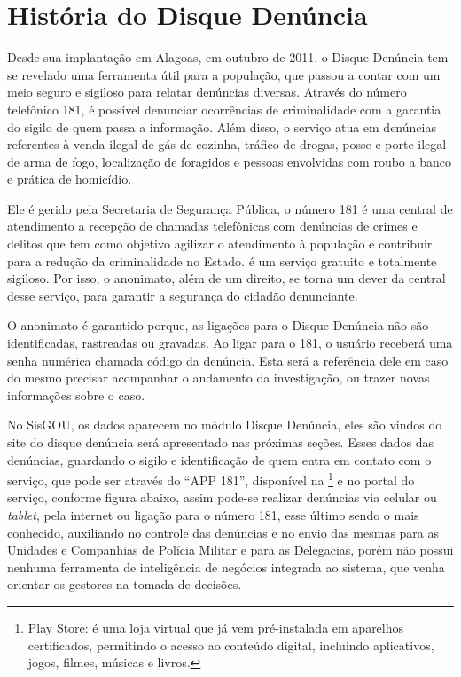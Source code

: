 \section{História do Disque Denúncia}		

Desde sua implanta\c{c}\~{a}o em Alagoas, em outubro de 2011, o Disque-Denúncia tem se revelado uma ferramenta útil para a popula\c{c}\~{a}o, que passou a contar com um meio seguro e sigiloso para relatar denúncias diversas.
Atrav\'{e}s do número telefônico 181, \'{e} possível denunciar ocorrências de criminalidade com a garantia do sigilo de quem passa a informa\c{c}\~{a}o. Al\'{e}m disso, o servi\c{c}o atua em denúncias referentes \`{a} venda ilegal de g\'{a}s de cozinha, tr\'{a}fico de drogas, posse e porte ilegal de arma de fogo, localiza\c{c}\~{a}o de foragidos e pessoas envolvidas com roubo a banco e pr\'{a}tica de homicídio.

Ele \'{e} gerido pela Secretaria de Seguran\c{c}a Pública, o número 181 \'{e} uma central de atendimento a recep\c{c}\~{a}o de chamadas telefônicas com denúncias de crimes e delitos que tem como objetivo agilizar o atendimento \`{a} popula\c{c}\~{a}o e contribuir para a redu\c{c}\~{a}o da criminalidade no Estado. \'{e} um servi\c{c}o gratuito e totalmente sigiloso. Por isso, o anonimato, al\'{e}m de um direito, se torna um dever da central desse servi\c{c}o, para garantir a seguran\c{c}a do cidad\~{a}o denunciante.

O anonimato \'{e} garantido porque, as liga\c{c}ões para o Disque Denúncia n\~{a}o s\~{a}o identificadas, rastreadas ou gravadas. Ao ligar para o 181, o usu\'{a}rio receber\'{a} uma senha num\'{e}rica chamada código da denúncia. Esta ser\'{a} a referência dele em caso do mesmo precisar acompanhar o andamento da investiga\c{c}\~{a}o, ou trazer novas informa\c{c}ões sobre o caso.

No SisGOU, os dados aparecem no módulo Disque Denúncia, eles s\~{a}o vindos do site do disque denúncia ser\'{a} apresentado nas próximas se\c{c}ões. Esses dados das denúncias,  guardando o sigilo e identifica\c{c}\~{a}o de quem entra em contato com o servi\c{c}o, que pode ser atrav\'{e}s do ``APP 181'', disponível na  \footnote{Play Store: \'{e} uma loja virtual que j\'{a} vem pr\'{e}-instalada em aparelhos certificados, permitindo o acesso ao conteúdo digital, incluindo aplicativos, jogos, filmes, músicas e livros.} e no portal do servi\c{c}o, conforme figura abaixo, assim pode-se realizar denúncias via celular ou \textit{tablet}, pela internet ou liga\c{c}\~{a}o para o número 181, esse último sendo o mais conhecido, auxiliando no controle das denúncias e no envio das mesmas para as Unidades e Companhias de Polícia Militar e para as Delegacias, por\'{e}m n\~{a}o possui nenhuma ferramenta de inteligência de negócios integrada ao sistema, que venha orientar os gestores na tomada de decisões. 

